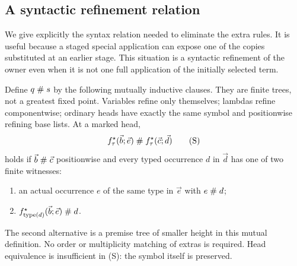 \subsection{A syntactic refinement relation}

We give explicitly the syntax relation needed to eliminate the
extra rules. It is useful because a staged special application
can expose one of the copies substituted at an earlier stage.
This situation is a syntactic refinement of the owner even
when it is not one full application of the initially selected
term.

Define $q\mathrel{\#} s$ by the following mutually inductive clauses.
They are finite trees, not a greatest fixed point.
Variables refine only themselves; lambdas refine componentwise;
ordinary heads have exactly the same symbol and positionwise
refining base lists. At a marked head,
\[
 f^\star_\tau(\vec b;\vec e)
       \mathrel{\#} f^\star_\tau(\vec c;\vec d)
 \tag{S}
\]
holds if $\vec b\mathrel{\#}\vec c$ positionwise and every typed
occurrence $d$ in $\vec d$ has one of two finite witnesses:
\begin{enumerate}[label=(\roman*)]
\item an actual occurrence $e$ of the same type in $\vec e$
with $e\mathrel{\#} d$;
\item $f^\star_{\operatorname{type}(d)}(\vec b;\vec e)
\mathrel{\#} d$.
\end{enumerate}
The second alternative is a premise tree of smaller height in
this mutual definition. No order or multiplicity matching of
extras is required. Head equivalence is insufficient in (S):
the symbol itself is preserved.

